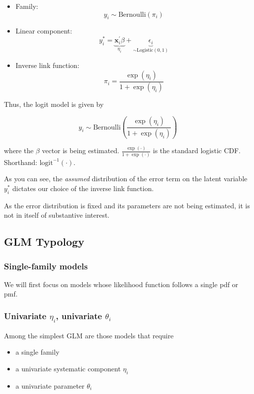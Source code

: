 \documentclass[
  11pt,
]{article}
\providecommand{\tightlist}{%
  \setlength{\itemsep}{0pt}\setlength{\parskip}{0pt}}
\begin{document}
\begin{itemize}
\tightlist
\item
  Family: \[y_i \sim \text{Bernoulli}(\pi_i)\]
\item
  Linear component: \[y_i^{\ast} = \underbrace{\mathbf{x}_i^{\prime} \beta}_{\eta_i} + \underbrace{\epsilon_i}_{\sim \text{Logistic}(0, 1)}\]
\item
  Inverse link function: \[\pi_i = \frac{\exp(\eta_i)}{1 + \exp(\eta_i)}\]
\end{itemize}

Thus, the logit model is given by

\[y_i \sim \text{Bernoulli}\left(\frac{\exp(\eta_i)}{1 + \exp(\eta_i)}\right)\]

where the \(\beta\) vector is being estimated. \(\frac{\exp(\cdot)}{1 + \exp(\cdot)}\) is the standard logistic CDF. Shorthand: \(\text{logit}^{-1}(\cdot)\).

As you can see, the \emph{assumed} distribution of the error term on the latent variable \(y_i^{\ast}\) dictates our choice of the inverse link function.

As the error distribution is fixed and its parameters are not being estimated, it is not in itself of substantive interest.

\hypertarget{glm-typology}{%
\subsection{GLM Typology}\label{glm-typology}}

\hypertarget{single-family-models}{%
\subsubsection{Single-family models}\label{single-family-models}}

We will first focus on models whose likelihood function follows a single pdf or pmf.

\hypertarget{univariate-eta_i-univariate-theta_i}{%
\subsubsection{\texorpdfstring{Univariate \(\eta_i\), univariate \(\theta_i\)}{Univariate \textbackslash eta\_i, univariate \textbackslash theta\_i}}\label{univariate-eta_i-univariate-theta_i}}

Among the simplest GLM are those models that require

\begin{itemize}
\tightlist
\item
  a single family
\item
  a univariate systematic component \(\eta_i\)
\item
  a univariate parameter \(\theta_i\)
\end{itemize}
\end{document}
